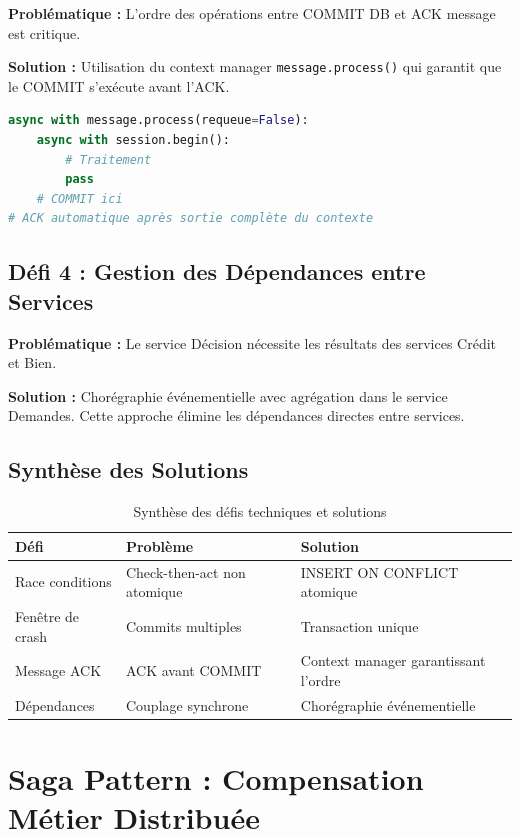 \documentclass[12pt,a4paper]{article}
\begin{document}
\textbf{Problématique :} L'ordre des opérations entre COMMIT DB et ACK message est critique.

\textbf{Solution :} Utilisation du context manager \texttt{message.process()} qui garantit que le COMMIT s'exécute avant l'ACK.

\begin{lstlisting}[language=Python]
async with message.process(requeue=False):
    async with session.begin():
        # Traitement
        pass
    # COMMIT ici
# ACK automatique après sortie complète du contexte
\end{lstlisting}

\subsection{Défi 4 : Gestion des Dépendances entre Services}

\textbf{Problématique :} Le service Décision nécessite les résultats des services Crédit et Bien.

\textbf{Solution :} Chorégraphie événementielle avec agrégation dans le service Demandes. Cette approche élimine les dépendances directes entre services.

\subsection{Synthèse des Solutions}

\begin{table}[H]
\centering
\small
\begin{tabular}{lp{5.5cm}p{5.5cm}}
\toprule
\textbf{Défi} & \textbf{Problème} & \textbf{Solution} \\
\midrule
Race conditions & Check-then-act non atomique & INSERT ON CONFLICT atomique \\
Fenêtre de crash & Commits multiples & Transaction unique \\
Message ACK & ACK avant COMMIT & Context manager garantissant l'ordre \\
Dépendances & Couplage synchrone & Chorégraphie événementielle \\
\bottomrule
\end{tabular}
\caption{Synthèse des défis techniques et solutions}
\end{table}

\section{Saga Pattern : Compensation Métier Distribuée}
\end{document}
